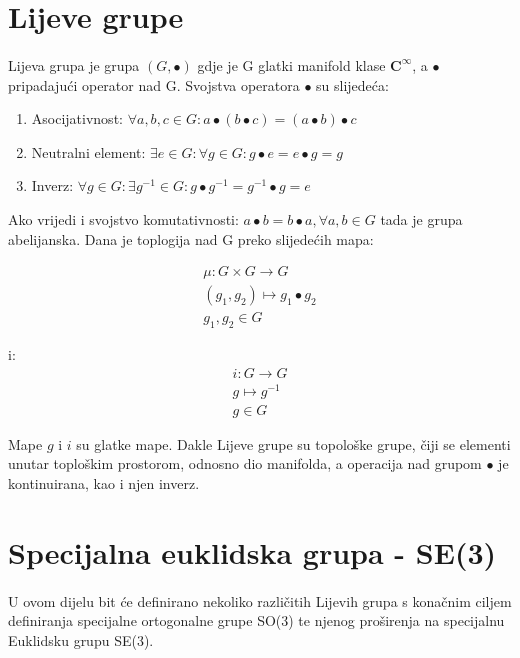 \documentclass[times, utf8, diplomski]{fer}
\begin{document}
\section{Lijeve grupe}

	\paragraph{} Lijeva grupa je grupa $(G, \bullet)$ gdje je G glatki manifold klase $\boldsymbol{C}^\infty$, a $\bullet$ pripadajući operator nad G. Svojstva operatora $\bullet$ su slijedeća: 
	\begin{enumerate}
		\item Asocijativnost: $\forall a, b, c \in G :  a\bullet(b\bullet c) = (a\bullet b) \bullet c$
		\item Neutralni element: $\exists e \in G : \forall g \in G : g \bullet e = e \bullet g = g$
		\item Inverz: $\forall g \in G : \exists g^{-1} \in G : g \bullet g^{-1} = g^{-1} \bullet g = e$
	\end{enumerate}
	Ako vrijedi i svojstvo komutativnosti: $a \bullet b = b \bullet a, \forall a, b \in G$ tada je grupa abelijanska. Dana je toplogija nad G preko slijedećih mapa:
	
	\begin{gather}
		\mu: G \times G \rightarrow G \\
		(g_1, g_2) \mapsto g_1 \bullet g_2 \\ g_1, g_2 \in G
	\end{gather}
	
	i: 
	\begin{gather}
		i: G \rightarrow G \\
		g \mapsto g^{-1} \\
		g \in G
	\end{gather}
	
	Mape $g$ i $i$ su glatke mape. Dakle Lijeve grupe su topološke grupe, čiji se elementi unutar toploškim prostorom, odnosno dio manifolda, a operacija nad grupom $\bullet$ je kontinuirana, kao i njen inverz.

	\newpage
	\clearpage
	
\section{Specijalna euklidska grupa - SE(3)}

	\paragraph{}U ovom dijelu bit će definirano nekoliko različitih Lijevih grupa s konačnim ciljem definiranja specijalne ortogonalne grupe SO(3) te njenog proširenja na specijalnu Euklidsku grupu SE(3). 	
	
\end{document}
